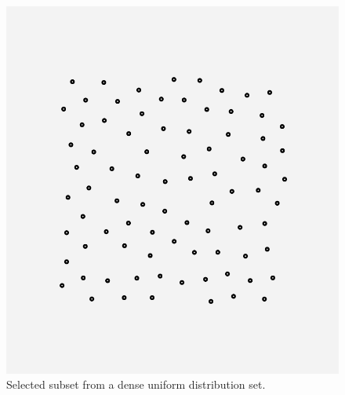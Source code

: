 \begin{figure}[!h] 
		\centering
		\includegraphics[width=0.25\linewidth]{Pictures/unif_res} 
  \caption{Selected subset from a dense uniform distribution set.}
  \label{fig:unif_res} 
\end{figure}

